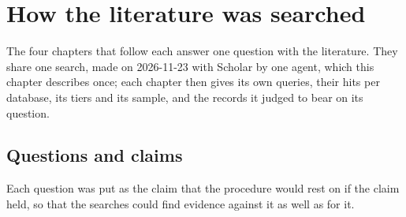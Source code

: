 \chapter{How the literature was searched}
\label{ch:lit-search}


The four chapters that follow each answer one question with the
literature.
They share one search, made on 2026-11-23 with Scholar by one agent,
which this chapter describes once; each chapter then gives its own
queries, their hits per database, its tiers and its sample, and the
records it judged to bear on its question.

\section{Questions and claims}
\label{sec:search-questions}

Each question was put as the claim that the procedure would rest on if
the claim held, so that the searches could find evidence against it as
well as for it.

